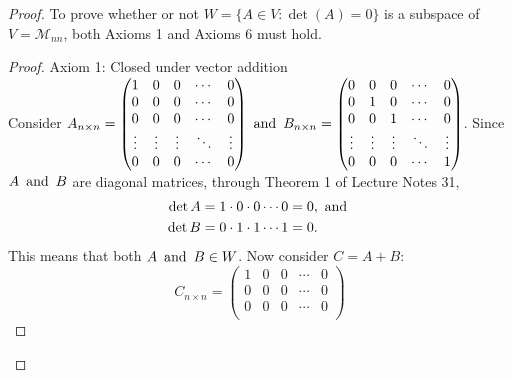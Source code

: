 \documentclass{article}
\begin{document}
\begin{proof}
    To prove whether or not $W = \{A \in V : \det(A) = 0\}$ is a subspace of $V = \mathcal{M}_{nn}$, both Axioms 1 and Axioms 6 must hold.

    \begin{proof}
        Axiom 1: Closed under vector addition \\
        Consider $A_{n \times n} = \begin{pmatrix}
                1      & 0      & 0      & \cdots & 0      \\
                0      & 0      & 0      & \cdots & 0      \\
                0      & 0      & 0      & \cdots & 0      \\
                \vdots & \vdots & \vdots & \ddots & \vdots \\
                0      & 0      & 0      & \cdots & 0
            \end{pmatrix} \operatorname{~\text{and}~} B_{n \times n} = \begin{pmatrix}
                0      & 0      & 0      & \cdots & 0      \\
                0      & 1      & 0      & \cdots & 0      \\
                0      & 0      & 1      & \cdots & 0      \\
                \vdots & \vdots & \vdots & \ddots & \vdots \\
                0      & 0      & 0      & \cdots & 1
            \end{pmatrix}$. Since $A \operatorname{~\text{and}~} B$ are diagonal matrices, through Theorem 1 of Lecture Notes 31,
        \begin{align*}
            \det A & = 1 \cdot 0 \cdot 0 \cdots 0 = 0, \operatorname{~\text{and}~} \\
            \det B & = 0 \cdot 1 \cdot 1 \cdots 1 = 0.
        \end{align*}
        This means that both $A \operatorname{~\text{and}~} B \in W$. Now consider $C = A + B$:
        \[
            C_{n \times n} = \begin{pmatrix}
                1      & 0      & 0      & \cdots & 0      \\
                0      & 0      & 0      & \cdots & 0      \\
                0      & 0      & 0      & \cdots & 0      \\

\end{pmatrix}\]
\end{proof}
\end{proof}
\end{document}
